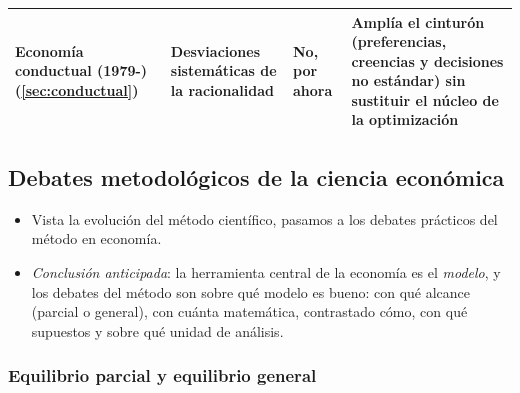 \documentclass[11pt]{article}
\begin{document}
\begin{table}[H]
\begin{tabular}{>{\raggedright\arraybackslash}m{2.5cm}>{\raggedright\arraybackslash}m{3.6cm}>{\raggedright\arraybackslash}m{3.3cm}>{\raggedright\arraybackslash}m{5.2cm}}
\addlinespace[0.3em]
Economía conductual (1979-) (\ref{sec:conductual}) & Desviaciones sistemáticas de la racionalidad & \textcolor{tceedorado}{\textbf{No}}, por ahora & Amplía el cinturón (preferencias, creencias y decisiones no estándar) sin sustituir el núcleo de la optimización\\
\bottomrule
\end{tabular}
\end{table}

\subsection{Debates metodológicos de la ciencia económica}\label{sec:debates-metodologicos}

\begin{itemize}
\item Vista la evolución del método científico, pasamos a los debates prácticos del método en economía.
\item \emph{Conclusión anticipada}: la herramienta central de la economía es el \emph{modelo}, y los debates del método son sobre qué modelo es bueno: con qué alcance (parcial o general), con cuánta matemática, contrastado cómo, con qué supuestos y sobre qué unidad de análisis.
\end{itemize}

\subsubsection{Equilibrio parcial y equilibrio general}\label{sec:parcial-general}
\end{document}
